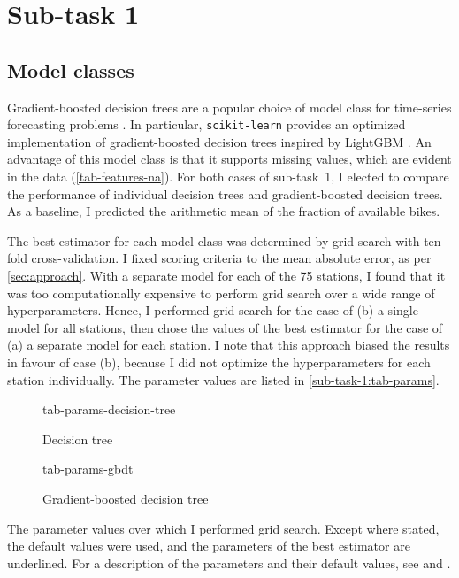 \section{Sub-task 1}
\label{sec:sub-task-1}

\subsection{Model classes}
\label{sec:sub-task-1:model-classes}

Gradient-boosted decision trees are a popular choice of model class for time-series
forecasting problems \parencite{Bojer2021}.
In particular, \texttt{scikit-learn} provides an optimized implementation of
gradient-boosted decision trees inspired by LightGBM \parencite{Ke2017}.
An advantage of this model class is that it supports missing values, which are evident
in the data (\cref{tab-features-na}).
For both cases of sub-task~1, I elected to compare the performance of individual
decision trees and gradient-boosted decision trees.
As a baseline, I predicted the arithmetic mean of the fraction of available bikes.

The best estimator for each model class was determined by grid search with ten-fold
cross-validation.
I fixed scoring criteria to the mean absolute error, as per \cref{sec:approach}.
With a separate model for each of the 75 stations, I found that it was too
computationally expensive to perform grid search over a wide range of hyperparameters.
Hence, I performed grid search for the case of (b) a single model for all stations,
then chose the values of the best estimator for the case of (a) a separate model for
each station.
I note that this approach biased the results in favour of case (b), because I did not
optimize the hyperparameters for each station individually.
The parameter values are listed in \cref{sub-task-1:tab-params}.

\begin{table}
  \centering
  \begin{subfigure}{\textwidth}
    \centering
    {tab-params-decision-tree}
    \caption{Decision tree}
    \label{sub-task-1:tab-params-decision-tree}
  \end{subfigure}
  \subfigurespace
  \begin{subfigure}{\textwidth}
    \centering
    {tab-params-gbdt}
    \caption{Gradient-boosted decision tree}
    \label{sub-task-1:tab-params-gbdt}
  \end{subfigure}
  \caption{
    The parameter values over which I performed grid search.
    Except where stated, the default values were used, and the parameters of the best
    estimator are underlined.
    For a description of the parameters and their default values, see
     and
    .
  }
  \label{sub-task-1:tab-params}
\end{table}

